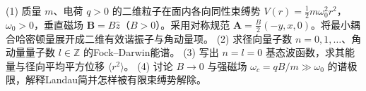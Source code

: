 (1) 质量 \(m\)、电荷 \(q>0\) 的二维粒子在面内各向同性束缚势 \(V(r)=\tfrac12m\omega_0^2r^2\)，\(\omega_0>0\)，垂直磁场 \(\mathbf B=B\hat z\)（\(B>0\)）。采用对称规范 \(\mathbf A=\frac B2(-y,x,0)\)。将最小耦合哈密顿量展开成二维有效谐振子与角动量项。
(2) 求径向量子数 \(n=0,1,\ldots\)、角动量量子数 \(l\in\mathbb Z\) 的Fock–Darwin能谱。
(3) 写出 \(n=l=0\) 基态波函数，求其能量与径向平均平方位移 \(\langle r^2\rangle\)。
(4) 讨论 \(B\to0\) 与强磁场 \(\omega_c=qB/m\gg\omega_0\) 的谱极限，解释Landau简并怎样被有限束缚势解除。
